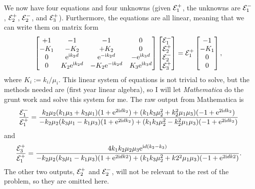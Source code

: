 \documentclass[11pt,letter, swedish, english
]{article}
\begin{document}
We now have four equations and four unknowns (given ${\mathcal{E}_1^+}$, the
unknowns are ${\mathcal{E}_1^-}$, ${\mathcal{E}_2^+}$, ${\mathcal{E}_2^-}$, and ${\mathcal{E}_3^+}$). Furthermore, the
equations are all linear, meaning that we can write them on matrix
form
\begin{equation}\label{eq:1_master_eqn}
\begin{bmatrix}
+1 & -1 & -1 & 0 \\
-K_1 & -K_2 & +K_2 &0\\
0& \mathrm{e}^{\mathrm{i} k_2d}& \mathrm{e}^{-\mathrm{i} k_2d}& -\mathrm{e}^{\mathrm{i} k_3d}\\
0& K_2\mathrm{e}^{\mathrm{i} k_2d}& -K_2\mathrm{e}^{-\mathrm{i} k_2d}& K_3\mathrm{e}^{\mathrm{i} k_3d}\\
\end{bmatrix}
\begin{bmatrix}
{\mathcal{E}_1^-} \\ {\mathcal{E}_2^+} \\ {\mathcal{E}_2^-} \\ {\mathcal{E}_3^+}
\end{bmatrix}
= {\mathcal{E}_1^+}
\begin{bmatrix}
-1 \\ -K_1 \\ 0 \\ 0
\end{bmatrix},
\end{equation}
where $K_i:=k_i/\mu_i$. This linear system of equations is not trivial
to solve, but the methods needed are (first year linear algebra), so I
will let \textit{Mathematica} do the grunt work and solve this system
for me. The raw output from Mathematica is
\begin{equation}\label{eq:1_Em}
\frac{{\mathcal{E}_1^-}}{{\mathcal{E}_1^+}}=
\frac{k_2\mu_2(k_1\mu_3 + k_3\mu_1)(1+\mathrm{e}^{2\mathrm{i} d k_2}) 
+(k_1k_3\mu_2^2 + k_2^2\mu_1\mu_3)(-1+\mathrm{e}^{2\mathrm{i} d k_2})
}{
-k_2\mu_2(k_3\mu_1 - k_1\mu_3)(1+\mathrm{e}^{2\mathrm{i} dk_2})
+(k_1k_3\mu_2^2 - k_2^2\mu_1\mu_3)(-1+\mathrm{e}^{2\mathrm{i} dk_2})
}
\end{equation}
and 
\begin{equation}\label{eq:1_Eppp}
\frac{{\mathcal{E}_3^+}}{{\mathcal{E}_1^+}} = 
\frac{4k_1k_2\mu_2\mu_3 \mathrm{e}^{\mathrm{i} d (k_2-k_3)}
}{
-k_2\mu_2(k_3\mu_1 - k_1\mu_3)(1+\mathrm{e}^{2\mathrm{i} d k2}) 
+(k_1k_3\mu_2^2 + k2^2\mu_1\mu_3) (-1+\mathrm{e}^{2\mathrm{i} d k2})
}.
\end{equation}
The other two outputs, ${\mathcal{E}_2^+}$ and ${\mathcal{E}_2^-}$, will not be relevant to the
rest of the problem, so they are omitted here. 
\end{document}
